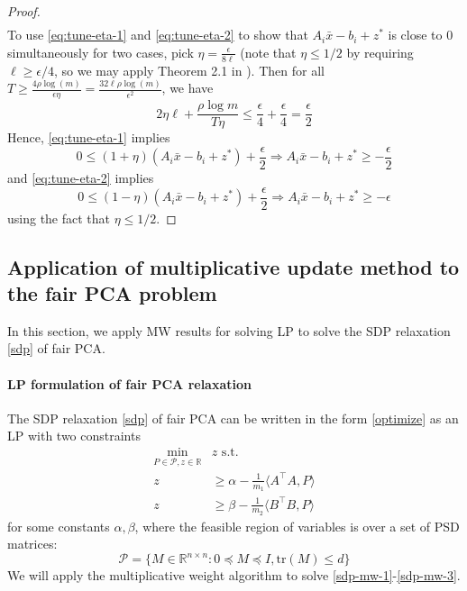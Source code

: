 \documentclass{article}
\newcommand{\cP}{\mathcal{P}}
\newcommand{\R}{\mathbb{R}}
\begin{document}
\begin{proof}
\begin{align}
\end{align}
To use \eqref{eq:tune-eta-1} and \eqref{eq:tune-eta-2} to show that \(A_i\bar{x}-b_i+z^*\) is close to 0 simultaneously for two cases, pick \(\eta = \frac{\epsilon}{8\ell}\) (note that \(\eta\leq1/2\) by requiring \(\ell\geq \epsilon/4\), so we may apply Theorem 2.1 in   \citet{arora2012multiplicative}). Then for all \(T \geq\frac{4\rho\log (m)}{\epsilon\eta}=\frac{32\ell\rho\log(m)}{\epsilon^2}\), we have
\begin{equation}
2\eta \ell +\frac{\rho\log m}{T\eta} \leq \frac{\epsilon}{4} +\frac{\epsilon}{4}=\frac{\epsilon}{2}
\end{equation}
Hence, \eqref{eq:tune-eta-1} implies
\begin{equation}
0 \leq (1+\eta)(A_i\bar{x}-b_i+z^*) +\frac{\epsilon}{2} \Rightarrow A_i\bar{x}-b_i+z^* \geq -\frac{\epsilon}{2}
\end{equation}
and \eqref{eq:tune-eta-2} implies
\begin{equation}
0 \leq (1-\eta)(A_i\bar{x}-b_i+z^*) +\frac{\epsilon}{2} \Rightarrow A_i\bar{x}-b_i+z^* \geq -\epsilon
\end{equation}
using the fact that \(\eta \leq 1/2\).
\end{proof}

\subsection{Application of multiplicative update method to the fair PCA problem} \label{sec:MW-fair-PCA}
In this section, we apply MW results for solving LP to solve the SDP relaxation \eqref{sdp} of fair PCA.

\paragraph{LP formulation of fair PCA relaxation} The SDP relaxation \eqref{sdp} of fair PCA can be written in the form \eqref{optimize} as an LP with two constraints
\begin{align} \label{sdp-mw-1}
\min_{P\in\cP,z\in\R} &z \text { s.t. } \\
z&\geq \alpha - \frac{1}{m_1}\langle A^\top A,P\rangle \label{sdp-mw-2} \\
z&\geq \beta -\frac{1}{m_2} \langle B^\top B,P\rangle \label{sdp-mw-3}
\end{align}
for some constants \(\alpha,\beta\), where the feasible region of variables is over a set of PSD matrices:
\begin{equation}
\cP=\{M\in\R^{n\times n}:0\preceq M \preceq I,\text{tr}(M)\leq d\}
\end{equation}
We will apply the multiplicative weight algorithm to solve \eqref{sdp-mw-1}-\eqref{sdp-mw-3}.
\end{document}
